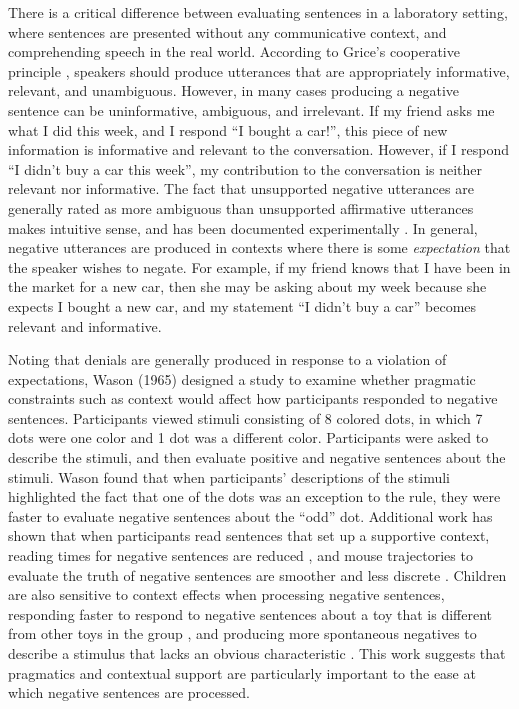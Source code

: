 \documentclass[man]{apa2}
\begin{document}
There is a critical difference between evaluating sentences in a laboratory setting, where sentences are presented without any communicative context, and comprehending speech in the real world. According to Grice's cooperative principle \cite{grice1975}, speakers should produce utterances that are appropriately informative, relevant, and unambiguous.  However, in many cases producing a negative sentence can be uninformative, ambiguous, and irrelevant.  If my friend asks me what I did this week, and I respond ``I bought a car!'', this piece of new information is informative and relevant to the conversation.  However, if I respond ``I didn't buy a car this week'', my contribution to the conversation is neither relevant nor informative.  The fact that unsupported negative utterances are generally rated as more ambiguous than unsupported affirmative utterances makes intuitive sense, and has been documented experimentally \cite{glenberg1999}.  In general, negative utterances are produced in contexts where there is some \emph{expectation} that the speaker wishes to negate.  For example, if my friend knows that I have been in the market for a new car, then she may be asking about my week because she expects I bought a new car, and my statement ``I didn't buy a car'' becomes relevant and informative.  

Noting that denials are generally produced in response to a violation of expectations, Wason (1965) designed a study to examine whether pragmatic constraints such as context would affect how participants responded to negative sentences.  Participants viewed stimuli consisting of 8 colored dots, in which 7 dots were one color and 1 dot was a different color.  Participants were asked to describe the stimuli, and then evaluate positive and negative sentences about the stimuli.  Wason found that when participants' descriptions of the stimuli highlighted the fact that one of the dots was an exception to the rule, they were faster to evaluate negative sentences about the ``odd'' dot.  Additional work has shown that when participants read sentences that set up a supportive context, reading times for negative sentences are reduced \cite{glenberg1999, ludtke2006}, and mouse trajectories to evaluate the truth of negative sentences are smoother and less discrete \cite{dale2011}.  Children are also sensitive to context effects when processing negative sentences, responding faster to respond to negative sentences about a toy that is different from other toys in the group \cite{devilliers1975}, and producing more spontaneous negatives to describe a stimulus that lacks an obvious characteristic \cite{watson1979}.  This work suggests that pragmatics and contextual support are particularly important to the ease at which negative sentences are processed.   
\end{document}
